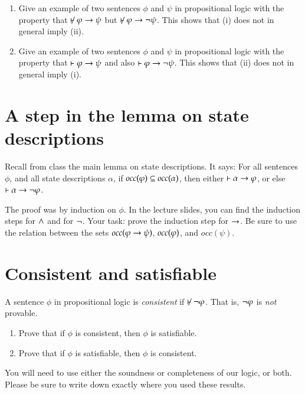 \documentclass[12pt]{article}
\begin{document}
\begin{enumerate}
\item Give an example of two sentences $\phi$ and $\psi$ in propositional logic 
with the property that $\not\proves \phi\iif \psi$ but    $ \not\proves \phi\iif \nott\psi$.
This shows that (i) does not in general imply (ii).
\item Give an example of two sentences $\phi$ and $\psi$ in propositional logic 
with the property that $\vdash \varphi\rightarrow \psi$ and also   $ \vdash \varphi\rightarrow \neg\psi$.
This shows that (ii) does not in general imply (i).
\end{enumerate}

 
\section{A step in the lemma on state descriptions}
Recall from class the main lemma on state descriptions.
It says:   For all sentences $\phi$, 
and all state descriptions $\alpha$, 
if $\mbox{\em occ}(\varphi)\subseteq \mbox{\em occ}(\alpha)$, then 
  either $\vdash \alpha\rightarrow \varphi$, or else $\vdash \alpha\rightarrow \neg\varphi$.

The proof was by induction on $\phi$.  In the lecture slides, you can find the induction steps for $\wedge$ and for $\neg$.
Your task: prove the induction step for $\rightarrow$.
Be sure to use the relation between the sets $\mbox{\em occ}(\varphi\rightarrow\psi)$, $\mbox{\em occ}(\varphi)$, and $occ(\psi)$.


 \section{Consistent and satisfiable}
 
 A sentence $\phi$ in propositional logic  is \emph{consistent} if $\not\proves\nott \phi$.
That is, $\neg\varphi$ is \emph{not} provable.  

\begin{enumerate}
\item 
Prove that if $\phi$ is consistent, then $\phi$ is satisfiable.
\item
Prove that if $\phi$ is satisfiable, then $\phi$ is consistent.
\end{enumerate}
You will need to use either the soundness or completeness of our logic, or both.
    Please be sure to write down exactly where
you used these results.
\end{document}
